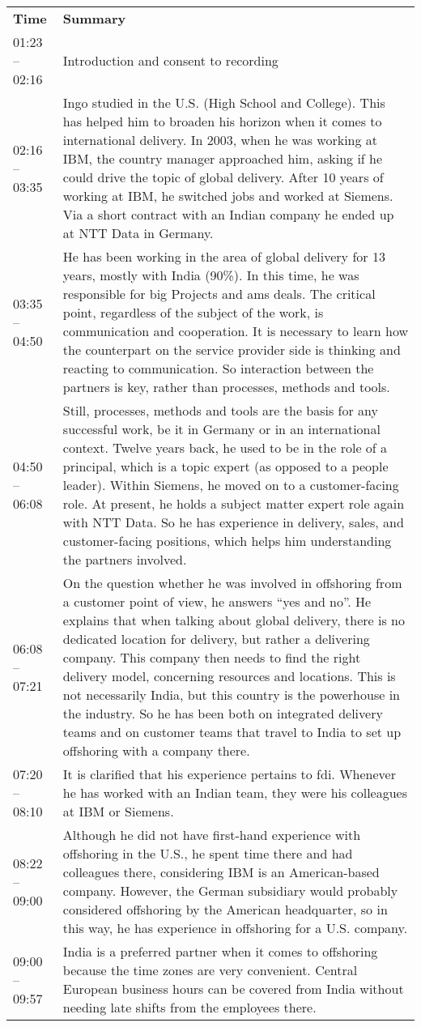 \begin{appendix}
\begin{longtable}{l p{12.5cm}}
	\textbf{Time} & \textbf{Summary} \\ 
	01:23 -- 02:16& Introduction and consent to recording\\
	02:16 -- 03:35& Ingo studied in the U.S. (High School and College). This has helped him to broaden his horizon when it comes to international delivery. In 2003, when he was working at IBM, the country manager approached him, asking if he could drive the topic of global delivery. After 10 years of working at IBM, he switched jobs and worked at Siemens. Via a short contract with an Indian company he ended up at NTT \nolinebreak Data in Germany.\\
	03:35 -- 04:50&He has been working in the area of global delivery for 13 years, mostly with India (90\%). In this time, he was responsible for big Projects and \gls{ams} deals. The critical point, regardless of the subject of the work, is communication and cooperation. It is necessary to learn how the counterpart on the service provider side is thinking and reacting to communication. So interaction between the partners is key, rather than processes, methods and tools.\\
	04:50 -- 06:08&Still, processes, methods and tools are the basis for any successful work, be it in Germany or in an international context. Twelve years back, he used to be in the role of a principal, which is a topic expert (as opposed to a people leader). Within Siemens, he moved on to a customer-facing role. At present, he holds a subject matter expert role again with NTT Data. So he has experience in delivery, sales, and customer-facing positions, which helps him understanding the partners involved.\\
	06:08 -- 07:21&On the question whether he was involved in offshoring from a customer point of view, he answers ``yes and no''. He explains that when talking about global delivery, there is no dedicated location for delivery, but rather a delivering company. This company then needs to find the right delivery model, concerning resources and locations. This is not necessarily India, but this country is the powerhouse in the industry. So he has been both on integrated delivery teams and on customer teams that travel to India to set up offshoring with a company there.\\
	07:20 -- 08:10 & It is clarified that his experience pertains to \gls{fdi}. Whenever he has worked with an Indian team, they were his colleagues at IBM or Siemens.\\
	08:22 -- 09:00&Although he did not have first-hand experience with offshoring in the U.S., he spent time there and had colleagues there, considering IBM is an American-based company. However, the German subsidiary would probably considered offshoring by the American headquarter, so in this way, he has experience in offshoring for a U.S. company.\\
	09:00 -- 09:57& India is a preferred partner when it comes to offshoring because the time zones are very convenient. Central European business hours can be covered from India without needing late shifts from the employees there.\\
	

\end{longtable}
\end{appendix}
